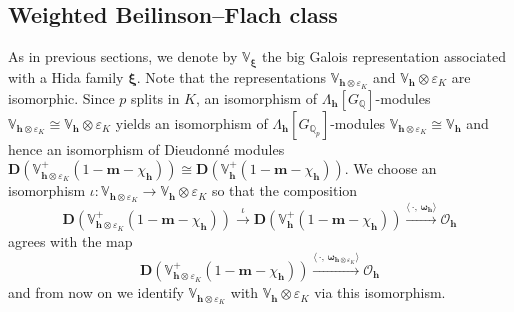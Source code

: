 \documentclass[a4paper,11pt]{amsart}
\theoremstyle{plain}
\theoremstyle{definition}
\theoremstyle{remark}
\newcommand{\bb}{\mathbb}
\newcommand{\cl}{\mathcal}
\newcommand{\hh}{{\mathbf h}}
\numberwithin{equation}{section}
\begin{document}
\subsection{Weighted Beilinson--Flach class}\label{subsec:weightedBF}

As in previous sections, we denote by $\bb{V}_{\bm{\xi}}$ the big Galois representation associated with a Hida family $\bm{\xi}$. Note that the representations $\bb{V}_{\hh\otimes\varepsilon_K}$ and $\bb{V}_{\hh}\otimes \varepsilon_K$ are isomorphic. Since $p$ splits in $K$, an isomorphism of $\Lambda_{\hh}[G_{\bb{Q}}]$-modules $\bb{V}_{\hh\otimes\varepsilon_K}\cong \bb{V}_{\hh}\otimes \varepsilon_K$ yields an isomorphism of $\Lambda_{\hh}[G_{\bb{Q}_p}]$-modules $\bb{V}_{\hh\otimes\varepsilon_K}\cong \bb{V}_{\hh}$ and hence an isomorphism of Dieudonn\'e modules $\mathbf{D}(\bb{V}_{\hh\otimes\varepsilon_K}^+(1-\mathbf{m}-\chi_{\hh}))\cong \mathbf{D}(\bb{V}_{\hh}^+(1-\mathbf{m}-\chi_{\hh}))$. We choose an isomorphism $\iota:\bb{V}_{\hh\otimes\varepsilon_K}\rightarrow \bb{V}_\hh\otimes\varepsilon_K$ so that the composition
\[
\mathbf{D}(\bb{V}_{\hh\otimes\varepsilon_K}^+(1-\mathbf{m}-\chi_{\hh}))\xrightarrow{\iota} \mathbf{D}(\bb{V}_{\hh}^+(1-\mathbf{m}-\chi_{\hh})) \xrightarrow[]{\langle\, \cdot ,\,\bm{\omega}_\hh\rangle} \cl{O}_{\hh}
\]
agrees with the map
\[
\mathbf{D}(\bb{V}_{\hh\otimes\varepsilon_K}^+(1-\mathbf{m}-\chi_{\hh}))\xrightarrow[]{\langle\, \cdot ,\,\bm{\omega}_{\hh\otimes\varepsilon_K}\rangle} \cl{O}_{\hh}
\]
and from now on we identify $\bb{V}_{\hh\otimes\varepsilon_K}$ with $\bb{V}_\hh\otimes\varepsilon_K$ via this isomorphism.
\end{document}
